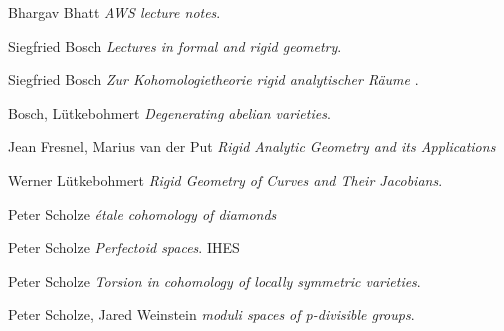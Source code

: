 \documentclass[10pt,oneside]{amsart}
\theoremstyle{definition}
\begin{document}
 
 
	
	\begin{thebibliography}{9}
		
					
		Bhargav Bhatt
		\textit{AWS lecture notes}. 
		
		
		Siegfried Bosch
		\textit{Lectures in formal and rigid geometry}.
		
		Siegfried Bosch
		\textit{Zur Kohomologietheorie rigid analytischer R\"aume }.
		
		Bosch, L\"utkebohmert
		\textit{Degenerating abelian varieties}.
		
		Jean Fresnel, Marius van der Put
		\textit{Rigid Analytic Geometry and its Applications}
		
		Werner L\"utkebohmert
		\textit{Rigid Geometry of Curves and Their Jacobians}. 
		
		
		Peter Scholze
		\textit{\'etale cohomology of diamonds}
		
		Peter Scholze
		\textit{Perfectoid spaces}.  IHES 
		
		Peter Scholze
		\textit{Torsion in cohomology of locally symmetric varieties}.
		
		Peter Scholze, Jared Weinstein
		\textit{moduli spaces of p-divisible groups}.
		
		
		
	\end{thebibliography}
	
	
	
	
	
	
	
	
	
	
	
	
	
	
\end{document}
